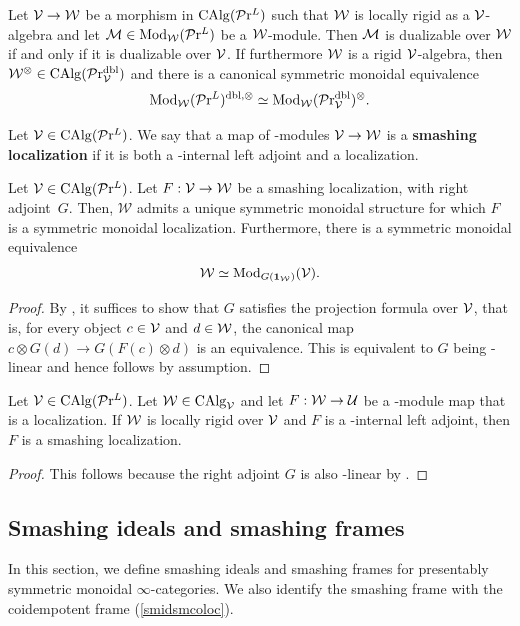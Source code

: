 \documentclass[10pt,a4paper,oneside]{article}
\begin{document}
\begin{prop}\label{appenb1}
Let $\mathcal{V}\to\mathcal{W}$ be a morphism in $\operatorname{CAlg}(\mathcal{P}\mathrm{r}^L)$ such that $\mathcal{W}$ is locally rigid as a $\mathcal{V}$-algebra and let $\mathcal{M}\in \operatorname{Mod}_\mathcal{W}(\mathcal{P}\mathrm{r}^L)$ be a $\mathcal{W}$-module. Then $\mathcal{M}$ is dualizable over $\mathcal{W}$ if and only if it is dualizable over $\mathcal{V}$. If furthermore $\mathcal{W}$ is a rigid $\mathcal{V}$-algebra, then $\mathcal{W}^\otimes\in\operatorname{CAlg}(\mathcal{P}\mathrm{r}_\mathcal{V}^{\operatorname{dbl}})$ and there is a canonical symmetric monoidal equivalence $$\operatorname{Mod}_\mathcal{W}(\mathcal{P}\mathrm{r}^L)^{\operatorname{dbl},\otimes}\simeq \operatorname{Mod}_\mathcal{W}(\mathcal{P}\mathrm{r}_\mathcal{V}^{\operatorname{dbl}})^\otimes.$$
\end{prop}

\begin{de}
Let $\mathcal{V}\in\operatorname{CAlg}(\mathcal{P}\mathrm{r}^L)$. We say that a map of \mcv-modules $\mathcal{V}\to\mathcal{W}$ is a \textbf{smashing localization} if it is both a \mcv-internal left adjoint and a localization.
\end{de}

\begin{prop}\label{rigidbarr}
Let $\mathcal{V}\in \operatorname{CAlg}(\mathcal{P}\mathrm{r}^L)$. Let $F:\mathcal{V}\to \mathcal{W}$ be a smashing localization, with right adjoint~$G$. Then, $\mathcal W$ admits
a unique symmetric monoidal structure for which $F$ is a symmetric monoidal localization. Furthermore, there is a symmetric monoidal equivalence
$$\mathcal{W}\simeq \operatorname{Mod}_{G(\mathbf{1}_{\mathcal{W}})}(\mathcal{V}).$$
\end{prop}

\begin{proof}
By \cite[Cor. 4.8.5.21]{ha}, it suffices to show that $G$ satisfies the projection formula over $\mathcal{V}$, that is, for every object $c\in \mathcal{V}$ and $d \in\mathcal{W}$, the canonical map $c \otimes G(d)\to G(F(c) \otimes d)$ is an equivalence. This is equivalent to $G$ being \mcv-linear and hence follows by assumption.
\end{proof}

\begin{prop}
Let $\mathcal{V}\in\operatorname{CAlg}(\mathcal{P}\mathrm{r}^L)$. Let $\mathcal{W}\in \operatorname{CAlg}_\mathcal{V}$ and let $F:\mathcal{W}\to \mathcal{U}$ be a \mcw-module map that is a localization. If $\mathcal{W}$ is locally rigid over $\mathcal{V}$ and $F$ is a \mcv-internal left adjoint, then $F$ is a smashing localization. 
\end{prop}

\begin{proof}
This follows because the right adjoint $G$ is also \mcw-linear by \cite[Proposition 4.18]{ramzi2024locally}.
\end{proof}

\subsection{Smashing ideals and smashing frames}
In this section, we define smashing ideals and smashing frames for presentably symmetric monoidal $\infty$-categories. We also identify the smashing frame with the coidempotent frame (\cref{smidsmcoloc}).
\end{document}
